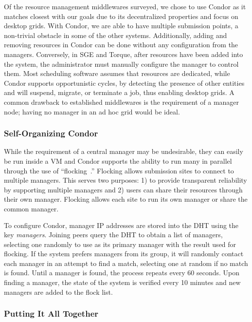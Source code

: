 \documentclass[twocolumn]{svjour3}
\begin{document}
Of the resource management middlewares surveyed, we chose to use Condor as it
matches closest with our goals due to its decentralized properties and focus on
desktop grids.  With Condor, we are able to have multiple submission points, a
non-trivial obstacle in some of the other systems.  Additionally, adding and
removing resources in Condor can be done without any configuration from the
managers.  Conversely, in SGE and Torque, after resources have been added into
the system, the administrator must manually configure the manager to control
them.  Most scheduling software assumes that resources are dedicated, while
Condor supports opportunistic cycles, by detecting the presence of other
entities and will suspend, migrate, or terminate a job, thus enabling desktop
grids.  A common drawback to established middlewares is the requirement of a
manager node; having no manager in an ad hoc grid would be ideal.

\subsubsection{Self-Organizing Condor}

While the requirement of a central manager may be undesirable, they can easily
be run inside a VM and Condor supports the ability to run many in parallel
through the use of ``flocking~\cite{flocking}.'' Flocking allows submission
sites to connect to multiple managers.  This serves two purposes: 1) to provide
transparent reliability by supporting multiple managers and 2) users can share
their resources through their own manager.  Flocking allows each site to run
its own manager or share the common manager.  

To configure Condor, manager IP addresses are stored into the DHT using the key
\emph{managers}.  Joining peers query the DHT to obtain a list of managers,
selecting one randomly to use as its primary manager with the result used for
flocking.  If the system prefers managers from its group, it will randomly
contact each manager in an attempt to find a match, selecting one at random if
no match is found.  Until a manager is found, the process repeats every 60
seconds.  Upon finding a manager, the state of the system is verified every 10
minutes and new managers are added to the flock list.

\subsubsection{Putting It All Together}
\end{document}
